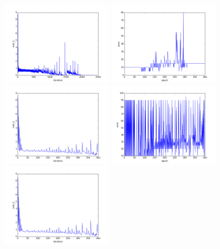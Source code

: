 \begin{figure}[htb]
\centering
\includegraphics[width=0.42\textwidth]{images/redes/ejecucion1/general_svm_casia/cost.png}
\includegraphics[width=0.42\textwidth]{images/redes/ejecucion1/general_svm_casia/error.png}
\includegraphics[width=0.42\textwidth]{images/redes/ejecucion1/general_svm_casia/minidataset/cost.png}
\includegraphics[width=0.42\textwidth]{images/redes/ejecucion1/general_svm_casia/minidataset/error.png}
\includegraphics[width=0.42\textwidth]{images/redes/ejecucion1/general_svm_casia/minidataset_tested_itself/cost.png}

\end{figure}
